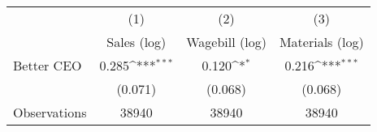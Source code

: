 {
\def\sym#1{\ifmmode^{#1}\else\(^{#1}\)\fi}
\begin{tabular}{l*{3}{c}}
\hline\hline
                    &\multicolumn{1}{c}{(1)}&\multicolumn{1}{c}{(2)}&\multicolumn{1}{c}{(3)}\\
                    &\multicolumn{1}{c}{Sales (log)}&\multicolumn{1}{c}{Wagebill (log)}&\multicolumn{1}{c}{Materials (log)}\\
\hline
Better CEO          &       0.285\sym{***}&       0.120\sym{*}  &       0.216\sym{***}\\
                    &     (0.071)         &     (0.068)         &     (0.068)         \\
\hline
Observations        &       38940         &       38940         &       38940         \\
\hline\hline
\end{tabular}
}
